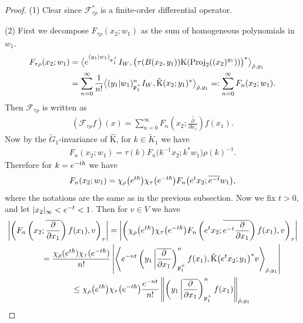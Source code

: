 \documentclass[11pt]{article}
\numberwithin{equation}{section}
\newcommand{\fp}{\mathfrak{p}}
\newcommand{\cF}{\mathcal{F}}
\newcommand{\rK}{\mathrm{K}}
\newcommand{\Proj}{\operatorname{Proj}}
\begin{document}
\begin{proof}
(1) Clear since $\cF_{\tau\rho}^*$ is a finite-order differential operator.

(2) First we decompose $F_{\tau\rho}(x_2;w_1)$ as the sum of homogeneous polynomials in $w_1$.
\begin{align*}
F_{\tau\rho}(x_2;w_1) &=\big\langle {\rm e}^{(y_1|w_1)_{\fp^+_1}}I_W,\bigl(\tau(B(x_2,y_1))\rK(\Proj_2((x_2)^{y_1}))\bigr)^*\big\rangle_{\hat{\rho},y_1} \\
&=\sum_{n=0}^\infty \frac{1}{n!}\big\langle (y_1|w_1)_{\fp^+_1}^nI_W, \hat{\rK}(x_2;y_1)^*\big\rangle_{\hat{\rho},y_1} =:\sum_{n=0}^\infty F_n(x_2;w_1).
\end{align*}
Then $\cF_{\tau\rho}$ is written as
\begin{gather*} (\cF_{\tau\rho}f)(x)=\sum_{n=0}^\infty F_n\left(x_2;\overline{\frac{\partial}{\partial x_1}}\right)f(x_1). \end{gather*}
Now by the $\tilde{G}_1$-invariance of $\hat{\rK}$, for $k\in \tilde{K}_1$ we have
\begin{gather*} F_n(x_2;w_1)=\tau(k)F_n\big(k^{-1}x_2;k^*w_1\big)\rho(k)^{-1}. \end{gather*}
Therefore for $k={\rm e}^{-t\hbar}$ we have
\begin{gather}\label{invariance_Fn}
F_n(x_2;w_1)=\chi_\rho\big({\rm e}^{t\hbar}\big)\chi_\tau\big({\rm e}^{-t\hbar}\big) F_n\big({\rm e}^tx_2;\overline{{\rm e}^{-t}}w_1\big),
\end{gather}
where the notations are the same as in the previous subsection.
Now we fix $t>0$, and let $|x_2|_\infty<{\rm e}^{-t}<1$. Then for $v\in V$ we have
\begin{gather*}
 \left|\left(F_n\left(x_2;\overline{\frac{\partial}{\partial x_1}}\right)f(x_1),v\right)_\tau\right| =\left|\left(\chi_\rho\big({\rm e}^{t\hbar}\big)\chi_\tau\big({\rm e}^{-t\hbar}\big)
F_n\left({\rm e}^tx_2;\overline{{\rm e}^{-t}\frac{\partial}{\partial x_1}}\right)f(x_1),v\right)_\tau\right| \\
\qquad{} =\frac{\chi_\rho({\rm e}^{t\hbar})\chi_\tau({\rm e}^{-t\hbar})}{n!}\left|\left\langle {\rm e}^{-nt}
\left(y_1\,\middle|\overline{\frac{\partial}{\partial x_1}}\right)_{\fp^+_1}^nf(x_1),
\hat{\rK}\big({\rm e}^tx_2;y_1\big)^*v\right\rangle_{\hat{\rho},y_1}\right| \\
\qquad{} \le \chi_\rho\big({\rm e}^{t\hbar}\big)\chi_\tau\big({\rm e}^{-t\hbar}\big)\frac{{\rm e}^{-nt}}{n!}
\left\Vert\left(y_1\,\middle|\overline{\frac{\partial}{\partial x_1}}\right)_{\fp^+_1}^nf(x_1)\right\Vert_{\hat{\rho},y_1}

\end{gather*}
\end{proof}
\end{document}
